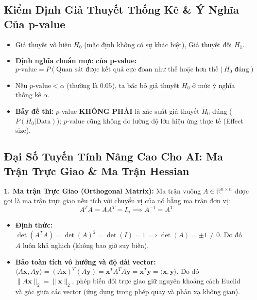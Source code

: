 \documentclass[10pt,a4paper]{article}
\begin{document}
\subsection{Kiểm Định Giả Thuyết Thống Kê \& Ý Nghĩa Của p-value}
\begin{itemize}[leftmargin=*]
    \item Giả thuyết vô hiệu $H_0$ (mặc định không có sự khác biệt), Giả thuyết đối $H_1$.
    \item \textbf{Định nghĩa chuẩn mực của p-value:}
    \begin{equation}
        p\text{-value} = P(\text{Quan sát được kết quả cực đoan như thế hoặc hơn thế} \mid H_0 \text{ đúng})
    \end{equation}
    \item Nếu $p\text{-value} < \alpha$ (thường là $0.05$), ta bác bỏ giả thuyết $H_0$ ở mức ý nghĩa thống kê $\alpha$.
    \item \textbf{Bẫy đề thi:} $p$-value \textbf{KHÔNG PHẢI} là xác suất giả thuyết $H_0$ đúng ($P(H_0 | \text{Data})$); $p$-value cũng không đo lường độ lớn hiệu ứng thực tế (Effect size).
\end{itemize}


\subsection{Đại Số Tuyến Tính Nâng Cao Cho AI: Ma Trận Trực Giao \& Ma Trận Hessian}
\textbf{1. Ma trận Trực Giao (Orthogonal Matrix):}
Ma trận vuông $A \in \mathbb{R}^{n \times n}$ được gọi là ma trận trực giao nếu tích với chuyển vị của nó bằng ma trận đơn vị:
\begin{equation}
    A^T A = A A^T = I_n \implies A^{-1} = A^T
\end{equation}
\begin{itemize}[leftmargin=*]
    \item \textbf{Định thức:} $\det(A^T A) = \det(A)^2 = \det(I) = 1 \implies \det(A) = \pm 1 \neq 0$. Do đó $A$ luôn khả nghịch (không bao giờ suy biến).
    \item \textbf{Bảo toàn tích vô hướng và độ dài vector:} $\langle A\mathbf{x}, A\mathbf{y} \rangle = (A\mathbf{x})^T (A\mathbf{y}) = \mathbf{x}^T A^T A \mathbf{y} = \mathbf{x}^T \mathbf{y} = \langle \mathbf{x}, \mathbf{y} \rangle$. Do đó $\|A\mathbf{x}\|_2 = \|\mathbf{x}\|_2$, phép biến đổi trực giao giữ nguyên khoảng cách Euclid và góc giữa các vector (ứng dụng trong phép quay và phản xạ không gian).
\end{itemize}
\end{document}
